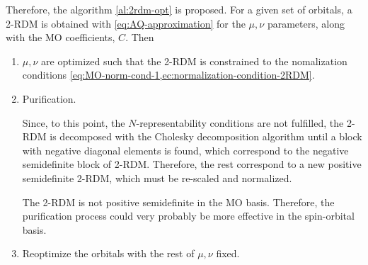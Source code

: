 Therefore, the algorithm \cref{al:2rdm-opt} is proposed.
For a given set of orbitals, a 2-RDM is obtained with \cref{eq:AQ-approximation}
for the $\mu, \nu$ parameters, along with the MO coefficients, $C$.
Then
\begin{enumerate}
    \item $\mu, \nu$ are optimized such that the 2-RDM is constrained
        to the nomalization conditions \cref{eq:MO-norm-cond-1,ec:normalization-condition-2RDM}.

    \item Purification.

        Since, to this point, the $N$-representability conditions are not
        fulfilled, the 2-RDM is decomposed with the Cholesky decomposition
        algorithm until a block with negative diagonal elements is found,
        which correspond to the negative semidefinite block of 2-RDM.
        Therefore, the rest correspond to a new positive semidefinite 2-RDM,
        which must be re-scaled and normalized.

        The 2-RDM is not positive semidefinite in the MO basis.
        Therefore, the purification process could very probably be more
        effective in the spin-orbital basis.

    \item Reoptimize the orbitals with the rest of $\mu, \nu$ fixed.
\end{enumerate}

